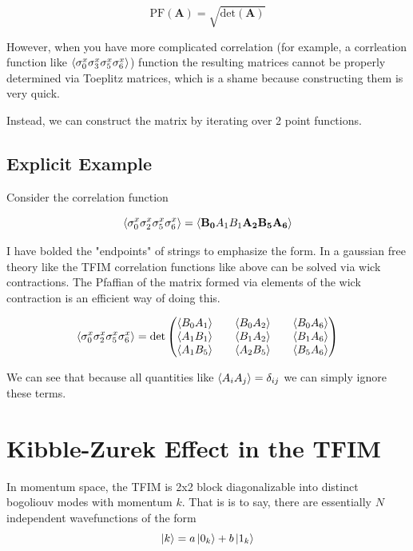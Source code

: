 \documentclass{article}
\begin{document}
\begin{equation}
    \text{PF}(\mathbf{A}) = \sqrt{\text{det}(\mathbf{A})}
\end{equation}

However, when you have more complicated correlation (for example, a corrleation function like $\braket{\sigma^x_{0}\sigma^x_{3} \sigma^x_{5} \sigma^x_{6}}$) function the resulting matrices cannot be properly determined via Toeplitz matrices, which is a shame because constructing them is very quick. 

Instead, we can construct the matrix by iterating over 2 point functions.

\subsection{Explicit Example}

Consider the correlation function 

$$\braket{\sigma^x_{0}\sigma^x_{2} \sigma^x_{5} \sigma^x_{6}} = \braket{\mathbf{B_0} A_1 B_1 \mathbf{A_2} \mathbf{B_5} \mathbf{A_6}  }$$

I have bolded the "endpoints" of strings to emphasize the form. In a gaussian free theory like the TFIM correlation functions like above can be solved via wick contractions. The Pfaffian of the matrix formed via elements of the wick contraction is an efficient way of doing this. 

\begin{equation}
    \braket{\sigma^x_{0}\sigma^x_{2} \sigma^x_{5} \sigma^x_{6}} = 
    \det{
    \begin{pmatrix}
        \braket{B_0A_1} && \braket{B_0 A_2} && \braket{B_0 A_6} \\
        \braket{A_1 B_1} && \braket{B_1 A_2} && \braket{B_1 A_6} \\
        \braket{ A_1 B_5} && \braket{A_2 B_5 } && \braket{B_5 A_6}
    \end{pmatrix}}
\end{equation}

We can see that because all quantities like $\braket{A_i A_j}=\delta_{ij}$ we can simply ignore these terms. 

\section{Kibble-Zurek Effect in the TFIM}

In momentum space, the TFIM is 2x2 block diagonalizable into distinct bogoliouv modes with momentum $k$. That is is to say, there are essentially $N$ independent wavefunctions of the form 
\begin{equation}
    \ket{k} = a \ket{0_k} + b \ket{1_k}
\end{equation}
\end{document}
